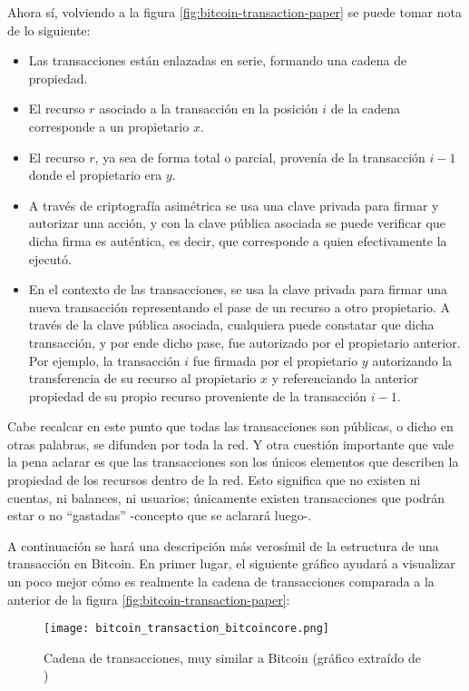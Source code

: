 Ahora sí, volviendo a la figura \ref{fig:bitcoin-transaction-paper} se puede tomar nota de lo siguiente:

\begin{itemize}
  \item Las transacciones están enlazadas en serie, formando una cadena de propiedad.
  \item El recurso $r$ asociado a la transacción en la posición $i$ de la cadena corresponde a un propietario $x$.
  \item El recurso $r$, ya sea de forma total o parcial, provenía de la transacción $i - 1$ donde el propietario era $y$.
  \item A través de criptografía asimétrica se usa una clave privada para firmar y autorizar una acción, y con la clave pública asociada se puede verificar que dicha firma es auténtica, es decir, que corresponde a quien efectivamente la ejecutó.
  \item En el contexto de las transacciones, se usa la clave privada para firmar una nueva transacción representando el pase de un recurso a otro propietario. A través de la clave pública asociada, cualquiera puede constatar que dicha transacción, y por ende dicho pase, fue autorizado por el propietario anterior. Por ejemplo, la transacción $i$ fue firmada por el propietario $y$ autorizando la transferencia de su recurso al propietario $x$ y referenciando la anterior propiedad de su propio recurso proveniente de la transacción $i - 1$.
\end{itemize}

Cabe recalcar en este punto que todas las transacciones son públicas, o dicho en otras palabras, se difunden por toda la red. Y otra cuestión importante que vale la pena aclarar es que las transacciones son los únicos elementos que describen la propiedad de los recursos dentro de la red. Esto significa que no existen ni cuentas, ni balances, ni usuarios; únicamente existen transacciones que podrán estar o no ``gastadas'' -concepto que se aclarará luego-.

A continuación se hará una descripción más verosímil de la estructura de una transacción en Bitcoin. En primer lugar, el siguiente gráfico ayudará a visualizar un poco mejor cómo es realmente la cadena de transacciones comparada a la anterior de la figura \ref{fig:bitcoin-transaction-paper}:

\begin{figure}[H]
  \texttt{[image: bitcoin\_transaction\_bitcoincore.png]}
  \centering
  \caption{Cadena de transacciones, muy similar a Bitcoin (gráfico extraído de \cite{Narayanan:2016:BCT:2994437})}
  \label{fig:bitcoin-transaction-bitcoincore}
\end{figure}

